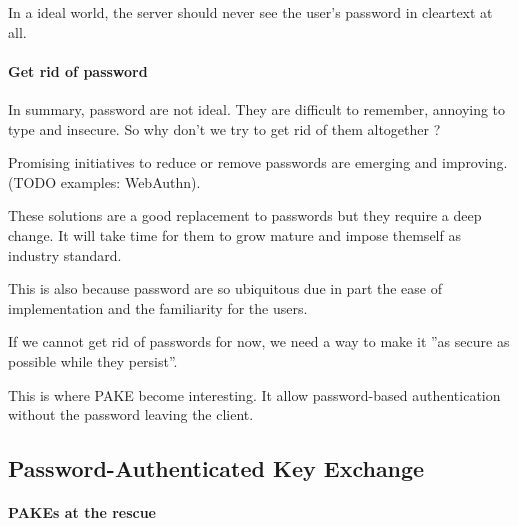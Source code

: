 \documentclass[../report.tex]{subfiles}
\begin{document}
In a ideal world, the server should never see the user's password in cleartext at all.


\paragraph{Get rid of password}

In summary, password are not ideal. They are difficult to remember, annoying to type and insecure.
So why don't we try to get rid of them altogether ?

Promising initiatives to reduce or remove passwords are emerging and improving. (TODO examples: WebAuthn).

These solutions are a good replacement to passwords but they require a deep change. It will take time for them to grow mature and impose themself as industry standard.

This is also because password are so ubiquitous due in part the ease of implementation and the familiarity for the users.

If we cannot get rid of passwords for now, we need a way to make it ''as secure as possible while they persist''.



This is where PAKE become interesting. It allow password-based authentication without the password leaving the client.




\subsection{Password-Authenticated Key Exchange}
\paragraph{PAKEs at the rescue}

% 


\end{document}
